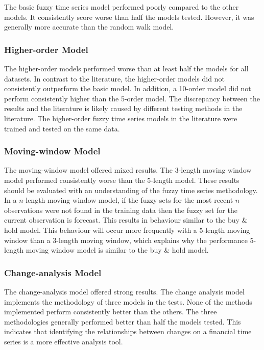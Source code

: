\documentclass[12pt, oneside, a4paper]{article}
\theoremstyle{definition}
\begin{document}
The basic fuzzy time series model performed poorly compared to the other models. It consistently score worse than half the models tested. However, it was generally more accurate than the random walk model.

\subsubsection{Higher-order Model}

The higher-order models performed worse than at least half the models for all datasets. In contrast to the literature, the higher-order models did not consistently outperform the basic model. In addition, a 10-order model did not perform consistently higher than the 5-order model. The discrepancy between the results and the literature is likely caused by different testing methods in the literature. The higher-order fuzzy time series models in the literature were trained and tested on the same data.

\subsubsection{Moving-window Model}

The moving-window model offered mixed results. The 3-length moving window model performed consistently worse than the 5-length model. These results should be evaluated with an understanding of the fuzzy time series methodology. In a $n$-length moving window model, if the fuzzy sets for the most recent $n$ observations were not found in the training data then the fuzzy set for the current observation is forecast. This results in behaviour similar to the buy \& hold model. This behaviour will occur more frequently with a 5-length moving window than a 3-length moving window, which explains why the performance 5-length moving window model is similar to the buy \& hold model.

\subsubsection{Change-analysis Model}

The change-analysis model offered strong results. The change analysis model implements the methodology of three models in the tests. None of the methods implemented perform consistently better than the others. The three methodologies generally performed better than half the models tested. This indicates that identifying the relationships between changes on a financial time series is a more effective analysis tool.
\end{document}
